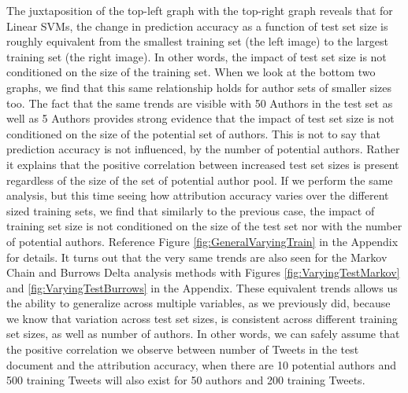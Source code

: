 \documentclass[pageno]{jpaper}
\begin{document}
The juxtaposition of the top-left graph with the top-right graph reveals that for Linear SVMs, the change in prediction accuracy as a function of test set size is roughly equivalent from the smallest training set (the left image) to the largest training set (the right image).  In other words, the impact of test set size is not conditioned on the size of the training set.  When we look at the bottom two graphs, we find that this same relationship holds for author sets of smaller sizes too.  The fact that the same trends are visible with 50 Authors in the test set as well as 5 Authors provides strong evidence that the impact of test set size is not conditioned on the size of the potential set of authors.  This is not to say that prediction accuracy is not influenced, by the number of potential authors.  Rather it explains that the positive correlation between increased test set sizes is present regardless of the size of the set of potential author pool.  If we perform the same analysis, but this time seeing how attribution accuracy varies over the different sized training sets, we find that similarly to the previous case, the impact of training set size is not conditioned on the size of the test  set nor with the number of potential authors.  Reference Figure \ref{fig:GeneralVaryingTrain} in the Appendix for details. It turns out that the very same trends are also seen for the Markov Chain and Burrows Delta analysis methods with Figures \ref{fig:VaryingTestMarkov} and \ref{fig:VaryingTestBurrows} in the Appendix.  These equivalent trends allows us the ability to generalize across multiple variables, as we previously did, because we know that variation across test set sizes, is consistent across different training set sizes, as well as number of authors.  In other words, we can safely assume that the positive correlation we observe between number of Tweets in the test document and the attribution accuracy, when there are 10 potential authors and 500 training Tweets will also exist for 50 authors and 200 training Tweets. 
\end{document}
